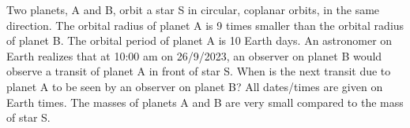 Two planets, A and B, orbit a star S in circular, coplanar orbits, in the same direction. The orbital radius
of planet A is 9 times smaller than the orbital radius of planet B. The orbital period of planet A is 10 Earth
days. An astronomer on Earth realizes that at 10:00 am on 26/9/2023, an observer on planet B would observe
a transit of planet A in front of star S. When is the next transit due to planet A to be seen by an observer
on planet B? All dates/times are given on Earth times. The masses of planets A and B are very small
compared to the mass of star S.
